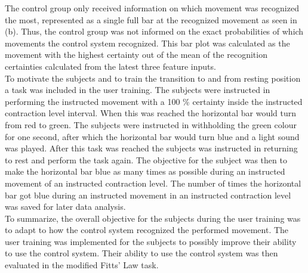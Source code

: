 The control group only received information on which movement was recognized the most, represented as a single full bar at the recognized movement as seen in  (b). Thus, the control group was not informed on the exact probabilities of which movements the control system recognized. This bar plot was calculated as the movement with the highest certainty out of the mean of the recognition certainties calculated from the latest three feature inputs. \\
To motivate the subjects and to train the transition to and from resting position a task was included in the user training. The subjects were instructed in performing the instructed movement with a 100 \% certainty inside the instructed contraction level interval. When this was reached the horizontal bar would turn from red to green. The subjects were instructed in withholding the green colour for one second, after which the horizontal bar would turn blue and a light sound was played. After this task was reached the subjects was instructed in returning to rest and perform the task again. The objective for the subject was then to make the horizontal bar blue as many times as possible during an instructed movement of an instructed contraction level. The number of times the horizontal bar got blue during an instructed movement in an instructed contraction level was saved for later data analysis. \\

To summarize, the overall objective for the subjects during the user training was to adapt to how the control system recognized the performed movement. The user training was implemented for the subjects to possibly improve their ability to use the control system. Their ability to use the control system was then evaluated in the modified Fitts' Law task. 











 







